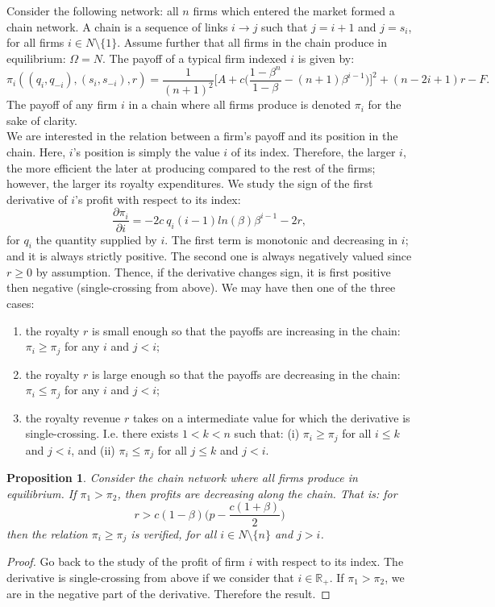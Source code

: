 \documentclass{article}
\newtheorem{proposition}{Proposition}
\begin{document}
Consider the following network: all $n$ firms which entered the market formed a chain network. A chain is a sequence of links $i\rightarrow j$ such that $j=i+1$ and $j= s_i$, for all firms $i\in N\setminus \{1\}$. Assume further that all firms in the chain produce in equilibrium: $\Omega = N$. The payoff of a typical firm indexed $i$ is given by: 
\begin{equation*}
    \pi_i((q_i,q_{-i}), (s_i,s_{-i}), r) = \dfrac{1}{(n+1)^2}\Big[A+c\Big(\dfrac{1-\beta^n}{1-\beta}-(n+1)\beta^{i-1}\Big)\Big]^2 + (n-2i+1)r-F.
\end{equation*}
The payoff of any firm $i$ in a chain where all firms produce is denoted $\pi_i$ for the sake of clarity. \\
We are interested in the relation between a firm's payoff and its position in the chain. Here, $i$'s position is simply the value $i$ of its index. Therefore, the larger $i$, the more efficient the later at producing compared to the rest of the firms; however, the larger its royalty expenditures. We study the sign of the first derivative of $i$'s profit with respect to its index: 
\begin{equation}
    \dfrac{\partial \pi_i}{\partial i}= -2 c ~q_i (i-1)ln(\beta)\beta^{i-1}-2r,
\end{equation}
for $q_i$ the quantity supplied by $i$. The first term is monotonic and decreasing in $i$; and it is always strictly positive. The second one is always negatively valued since $r\geq 0$ by assumption. Thence, if the derivative changes sign, it is first positive then negative (single-crossing from above). We may have then one of the three cases: 
\begin{enumerate}
    \item the royalty $r$ is small enough so that the payoffs are increasing in the chain: $\pi_i\geq \pi_j$ for any $i$ and $j<i$; 
    \item the royalty $r$ is large enough so that the payoffs are decreasing in the chain: $\pi_i\leq \pi_j$ for any $i$ and $j<i$;
    \item the royalty revenue $r$ takes on a intermediate value for which the derivative is single-crossing. I.e. there exists $1<k<n$ such that: (i) $\pi_i\geq \pi_j$ for all $i\leq k$ and $j<i$, and (ii) $\pi_i\leq \pi_j$ for all $j\leq k$ and $j<i$. 
\end{enumerate}

\begin{proposition}
Consider the chain network where all firms produce in equilibrium. If $\pi_1> \pi_2$, then profits are decreasing along the chain. That is: for 
\begin{equation*}
    r>c(1-\beta)\Big(p-\dfrac{c(1+\beta)}{2}\Big)
\end{equation*}
then the relation $\pi_i\geq \pi_j$ is verified, for all $i\in N\setminus\{n\}$ and $j>i$. 
\end{proposition} 
\begin{proof}
    Go back to the study of the profit of firm $i$ with respect to its index. The derivative is single-crossing from above if we consider that $i\in \mathbb{R}_{+}$. If $\pi_1>\pi_2$, we are in the negative part of the derivative. Therefore the result. 
\end{proof}
\end{document}
